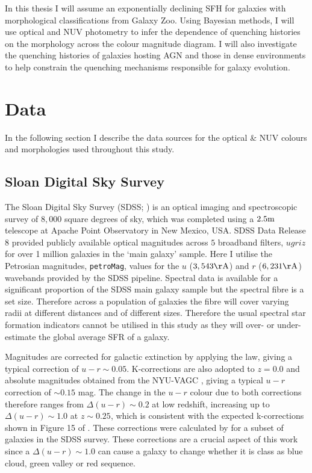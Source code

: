 In this thesis I will assume an exponentially declining SFH for galaxies with morphological classifications from Galaxy Zoo. Using Bayesian methods, I will use optical and NUV photometry to infer the dependence of quenching histories on the morphology across the colour magnitude diagram. I will also investigate the quenching histories of galaxies hosting AGN and those in dense environments to help constrain the quenching mechanisms responsible for galaxy evolution.

\section{Data}\label{sec:data}

In the following section I describe the data sources for the optical \& NUV colours and morphologies used throughout this study.

\subsection{Sloan Digital Sky Survey}\label{sec:sdssintro}

The Sloan Digital Sky Survey (SDSS; \citealt{york00}) is an optical imaging and spectroscopic survey of $8,000$ square degrees of sky, which was completed using a $2.5\rm{m}$ telescope at Apache Point Observatory in New Mexico, USA. SDSS Data Release 8 \citep{aihara11} provided publicly available optical magnitudes across $5$ broadband filters, $ugriz$ for over 1 million galaxies in the `main galaxy' sample. Here I utilise the Petrosian magnitudes, {\tt petroMag}, values for the $u$ ($3,543\rm{\AA}$) and $r$ ($6,231\rm{\AA}$) wavebands provided by the SDSS pipeline. Spectral data is available for a significant proportion of the SDSS main galaxy sample but the spectral fibre is a set size. Therefore across a population of galaxies the fibre will cover varying radii at different distances and of different sizes. Therefore the usual spectral star formation indicators cannot be utilised in this study as they will over- or under-estimate the global average SFR of a galaxy. 

Magnitudes are corrected for galactic extinction \citep{Oh11} by applying the \citet{Cardelli89} law, giving a typical correction of $u-r \sim 0.05$. K-corrections are also adopted to $z=0.0$ and absolute magnitudes obtained from the NYU-VAGC \citep{Blanton05, padmanabhan08, blanton07}, giving a typical $u-r$ correction of $\sim 0.15$ mag. The change in the $u-r$ colour due to both corrections therefore ranges from $\Delta (u-r) \sim 0.2$ at low redshift, increasing up to $\Delta (u-r) \sim 1.0$ at $z \sim 0.25$, which is consistent with the expected k-corrections shown in Figure 15 of \citet{blanton07}. These corrections were calculated by \citet{Bamford09} for a subset of galaxies in the SDSS survey. These corrections are a crucial aspect of this work since a $\Delta (u-r) \sim 1.0$ can cause a galaxy to change whether it is class as blue cloud, green valley or red sequence.


